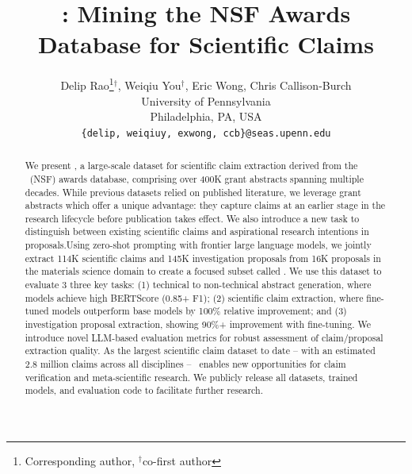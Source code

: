 \documentclass[11pt]{article}
\title{\DatasetName: Mining the NSF Awards Database for Scientific Claims}
\author{Delip Rao\thanks{Corresponding author, $^\dagger$co-first author}$^\dagger$, Weiqiu You$^\dagger$, Eric Wong, Chris Callison-Burch \\
	    University of Pennsylvania \\
        Philadelphia, PA, USA \\
	    {\tt \{delip, weiqiuy, exwong, ccb\}@seas.upenn.edu} }
\begin{document}
\maketitle
\begin{abstract}

We present \DatasetName, a large-scale dataset for scientific claim extraction derived from the \NSF~(NSF) awards database, comprising over 400K grant abstracts spanning multiple decades. While previous datasets relied on published literature, we leverage grant abstracts which offer a unique advantage: they capture claims at an earlier stage in the research lifecycle before publication takes effect. We also introduce a new task  to distinguish between existing scientific claims and aspirational research intentions in proposals.Using zero-shot prompting with frontier large language models, we jointly extract 114K scientific claims and 145K investigation proposals from 16K proposals in the materials science domain to create a focused subset called \DatasetNameMatSci. We use this dataset to evaluate 3 three key tasks: (1) technical to non-technical abstract generation, where models achieve high BERTScore (0.85+ F1); (2) scientific claim extraction, where fine-tuned models outperform base models by 100\% relative improvement; and (3) investigation proposal extraction, showing 90\%+ improvement with fine-tuning. We introduce novel LLM-based evaluation metrics for robust assessment of claim/proposal extraction quality. As the largest scientific claim dataset to date -- with an estimated 2.8 million claims across all disciplines -- \DatasetName~enables new opportunities for claim verification and meta-scientific research. We publicly release all datasets, trained models, and evaluation code to facilitate further research.
\end{abstract}
\end{document}
